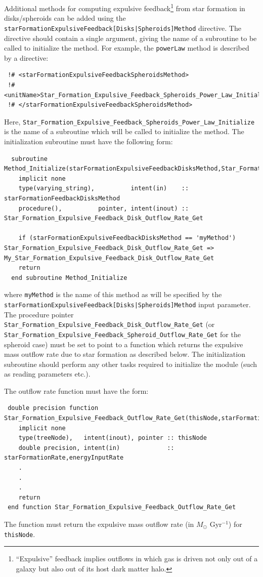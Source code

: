 Additional methods for computing expulsive feedback\footnote{``Expulsive'' feedback implies outflows in which gas is driven not only out of a galaxy but also out of its host dark matter halo.} from star formation in disks/spheroids can be added using the {\tt starFormationExpulsiveFeedback[Disks|Spheroids]Method} directive. The directive should contain a single argument, giving the name of a subroutine to be called to initialize the method. For example, the {\tt powerLaw} method is described by a directive:
\begin{verbatim}
 !# <starFormationExpulsiveFeedbackSpheroidsMethod>
 !#  <unitName>Star_Formation_Expulsive_Feedback_Spheroids_Power_Law_Initialize</unitName>
 !# </starFormationExpulsiveFeedbackSpheroidsMethod>
\end{verbatim}
Here, {\tt Star\_Formation\_Expulsive\_Feedback\_Spheroids\_Power\_Law\_Initialize} is the name of a subroutine which will be called to initialize the method. The initialization subroutine must have the following form:
\begin{verbatim}
  subroutine Method_Initialize(starFormationExpulsiveFeedbackDisksMethod,Star_Formation_Expulsive_Feedback_Disk_Outflow_Rate_Get)
    implicit none
    type(varying_string),          intent(in)    :: starFormationFeedbackDisksMethod
    procedure(),          pointer, intent(inout) :: Star_Formation_Expulsive_Feedback_Disk_Outflow_Rate_Get
    
    if (starFormationExpulsiveFeedbackDisksMethod == 'myMethod') Star_Formation_Expulsive_Feedback_Disk_Outflow_Rate_Get => My_Star_Formation_Expulsive_Feedback_Disk_Outflow_Rate_Get
    return
  end subroutine Method_Initialize
\end{verbatim}
where {\tt myMethod} is the name of this method as will be specified by the {\tt starFormationExpulsiveFeedback[Disks|Spheroids]Method} input parameter. The procedure pointer {\tt Star\_Formation\_Expulsive\_Feedback\_Disk\_Outflow\_Rate\_Get} (or {\tt Star\_Formation\_Expulsive\_Feedback\_Spheroid\_Outflow\_Rate\_Get} for the spheroid case) must be set to point to a function which returns the expulsive mass outflow rate due to star formation as described below. The initialization subroutine should perform any other tasks required to initialize the module (such as reading parameters etc.).

The outflow rate function must have the form:
\begin{verbatim}
 double precision function Star_Formation_Expulsive_Feedback_Outflow_Rate_Get(thisNode,starFormationRate,energyInputRate)
    implicit none
    type(treeNode),   intent(inout), pointer :: thisNode
    double precision, intent(in)             :: starFormationRate,energyInputRate
    .
    .
    .
    return
 end function Star_Formation_Expulsive_Feedback_Outflow_Rate_Get
\end{verbatim}
The function must return the expulsive mass outflow rate (in $M_\odot$ Gyr$^{-1}$) for {\tt thisNode}.

